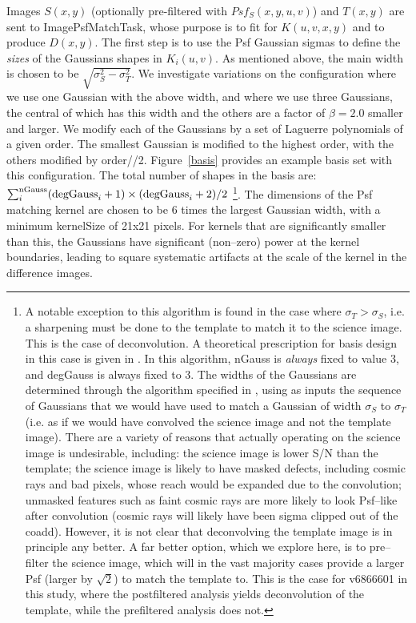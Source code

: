 \documentclass[prd, nofootinbib, floatfix, 11pt,tightenlines,times]{article}
\begin{document}
Images $S(x,y)$ (optionally pre-filtered with $Psf_S(x,y,u,v)$) and
$T(x,y)$ are sent to ImagePsfMatchTask, whose purpose is to fit for
$K(u,v,x,y)$ and to produce $D(x,y)$.  The first step is to use the
Psf Gaussian sigmas to define the {\it sizes} of the Gaussians shapes
in $K_i(u,v)$.  As mentioned above, the main width is chosen to be
$\sqrt{\sigma_S^2 - \sigma_T^2}$.  We investigate variations on the
configuration where we use one Gaussian with the above width, and
where we use three Gaussians, the central of which has this width and
the others are a factor of $\beta = 2.0$ smaller and larger.  We
modify each of the Gaussians by a set of Laguerre polynomials of a
given order.  The smallest Gaussian is modified to the highest order,
with the others modified by order//2.  Figure~\ref{basis} provides an
example basis set with this configuration.  The total number of shapes
in the basis are: $\sum_i^{\rm nGauss} ({\rm degGauss}_i+1)\times({\rm
  degGauss}_i+2)/2$ \footnote{ A notable exception to this algorithm
  is found in the case where $\sigma_T > \sigma_S$, i.e. a sharpening
  must be done to the template to match it to the science image.  This
  is the case of deconvolution.  A theoretical prescription for basis
  design in this case is given in \cite{0266-5611-26-8-085002}.  In
  this algorithm, nGauss is {\it always} fixed to value 3, and
  degGauss is always fixed to 3.  The widths of the Gaussians are
  determined through the algorithm specified in
  \cite{0266-5611-26-8-085002}, using as inputs the sequence of
  Gaussians that we would have used to match a Gaussian of width
  $\sigma_S$ to $\sigma_T$ (i.e. as if we would have convolved the
  science image and not the template image).  There are a variety of
  reasons that actually operating on the science image is undesirable,
  including: the science image is lower S/N than the template; the
  science image is likely to have masked defects, including cosmic
  rays and bad pixels, whose reach would be expanded due to the
  convolution; unmasked features such as faint cosmic rays are more
  likely to look Psf--like after convolution (cosmic rays will likely
  have been sigma clipped out of the coadd).  However, it is not clear
  that deconvolving the template image is in principle any better.  A
  far better option, which we explore here, is to pre--filter the
  science image, which will in the vast majority cases provide a
  larger Psf (larger by $\sqrt{2}$) to match the template to.  This is
  the case for v6866601 in this study, where the postfiltered analysis
  yields deconvolution of the template, while the prefiltered analysis
  does not.  }.
%
The dimensions of the Psf matching kernel are
chosen to be 6 times the largest Gaussian width, with a minimum
kernelSize of 21x21 pixels.  For kernels that are significantly
smaller than this, the Gaussians have significant (non--zero) power at
the kernel boundaries, leading to square systematic artifacts at the
scale of the kernel in the difference images.
\end{document}
